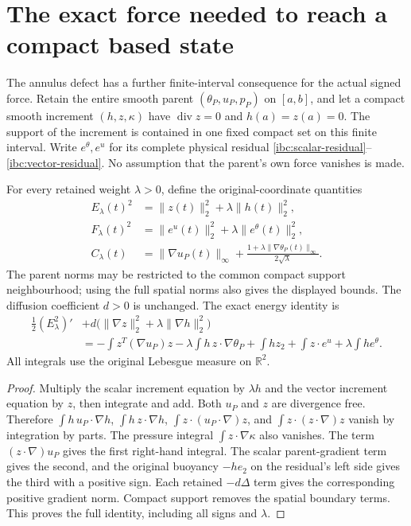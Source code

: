 \section{The exact force needed to reach a compact based state}
\label{ifr:section}

The annulus defect has a further finite-interval consequence for the
actual signed force.  Retain the entire smooth parent
$(\theta_P,u_P,p_P)$ on $[a,b]$, and let a compact smooth increment
$(h,z,\kappa)$ have $\operatorname{div}z=0$ and $h(a)=z(a)=0$.
The support of the increment is contained in one fixed compact set on
this finite interval.  Write $e^\theta,e^u$ for its complete physical
residual \eqref{ibc:scalar-residual}--\eqref{ibc:vector-residual}.
No assumption that the parent's own force vanishes is made.

For every retained weight $\lambda>0$, define the original-coordinate
quantities
\begin{align}
 E_\lambda(t)^2&=\|z(t)\|_2^2+\lambda\|h(t)\|_2^2,\nonumber\\
 F_\lambda(t)^2&=\|e^u(t)\|_2^2+\lambda\|e^\theta(t)\|_2^2,\nonumber\\
 C_\lambda(t)&=\|\nabla u_P(t)\|_\infty+
             \frac{1+\lambda\|\nabla\theta_P(t)\|_\infty}
                  {2\sqrt\lambda}.
 \label{ifr:weighted-data}
\end{align}
The parent norms may be restricted to the common compact support
neighbourhood; using the full spatial norms also gives the displayed
bounds.  The diffusion coefficient $d>0$ is unchanged.
The exact energy identity is
\begin{align}
 \frac12(E_\lambda^2)'&
   +d\bigl(\|\nabla z\|_2^2+\lambda\|\nabla h\|_2^2\bigr)\nonumber\\
 &= -\int z^T(\nabla u_P)z
    -\lambda\int h\,z\cdot\nabla\theta_P
    +\int h z_2
    +\int z\cdot e^u+\lambda\int h e^\theta .
 \label{ifr:energy-identity}
\end{align}
All integrals use the original Lebesgue measure on $\mathbb R^2$.

\begin{proof}
Multiply the scalar increment equation by $\lambda h$ and the vector
increment equation by $z$, then integrate and add.
Both $u_P$ and $z$ are divergence free.  Therefore
$\int h\,u_P\cdot\nabla h$, $\int h\,z\cdot\nabla h$,
$\int z\cdot(u_P\cdot\nabla)z$, and
$\int z\cdot(z\cdot\nabla)z$ vanish by integration by parts.
The pressure integral $\int z\cdot\nabla\kappa$ also vanishes.
The term $(z\cdot\nabla)u_P$ gives the first right-hand integral.
The scalar parent-gradient term gives the second, and the original
buoyancy $-he_2$ on the residual's left side gives the third with a
positive sign.  Each retained $-d\Delta$ term gives the corresponding
positive gradient norm.  Compact support removes the spatial boundary
terms.  This proves the full identity, including all signs and $\lambda$.
\end{proof}

